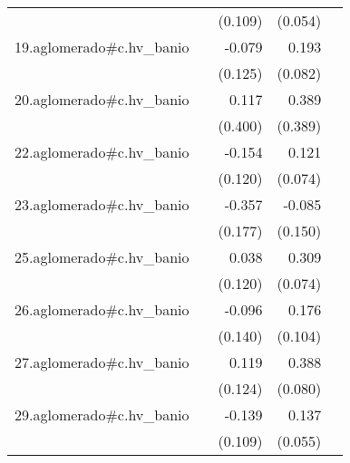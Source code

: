 {\begin{longtable}{l*{4}{D{.}{.}{-1}}}
            &                     &     (0.109)         &     (0.054)         &                     \\
\addlinespace
19.aglomerado#c.hv\_banio&                     &      -0.079         &       0.193\sym{*}  &                     \\
            &                     &     (0.125)         &     (0.082)         &                     \\
\addlinespace
20.aglomerado#c.hv\_banio&                     &       0.117         &       0.389         &                     \\
            &                     &     (0.400)         &     (0.389)         &                     \\
\addlinespace
22.aglomerado#c.hv\_banio&                     &      -0.154         &       0.121         &                     \\
            &                     &     (0.120)         &     (0.074)         &                     \\
\addlinespace
23.aglomerado#c.hv\_banio&                     &      -0.357\sym{*}  &      -0.085         &                     \\
            &                     &     (0.177)         &     (0.150)         &                     \\
\addlinespace
25.aglomerado#c.hv\_banio&                     &       0.038         &       0.309\sym{***}&                     \\
            &                     &     (0.120)         &     (0.074)         &                     \\
\addlinespace
26.aglomerado#c.hv\_banio&                     &      -0.096         &       0.176         &                     \\
            &                     &     (0.140)         &     (0.104)         &                     \\
\addlinespace
27.aglomerado#c.hv\_banio&                     &       0.119         &       0.388\sym{***}&                     \\
            &                     &     (0.124)         &     (0.080)         &                     \\
\addlinespace
29.aglomerado#c.hv\_banio&                     &      -0.139         &       0.137\sym{*}  &                     \\
            &                     &     (0.109)         &     (0.055)         &                     \\

\end{longtable}}
